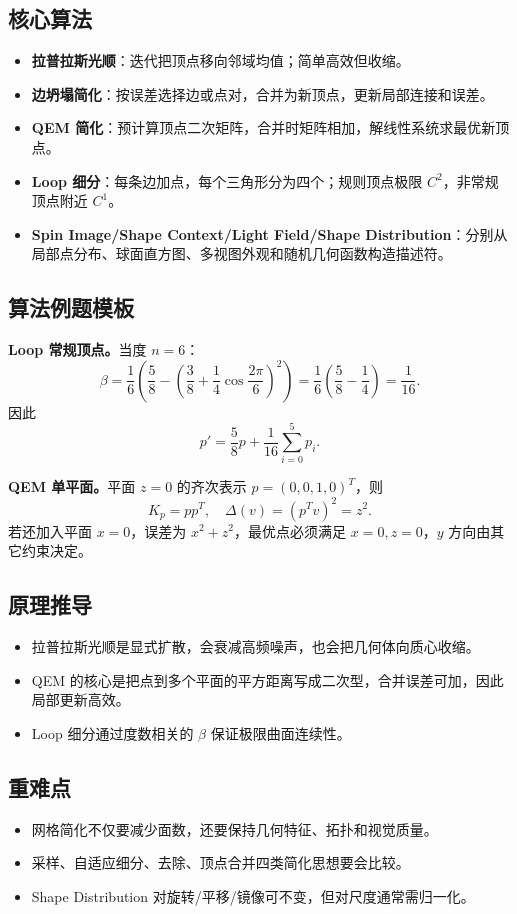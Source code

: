 \documentclass[UTF8,zihao=-4,scheme=chinese,fontset=fandol]{ctexart}
\newcommand{\key}[1]{\textbf{#1}}
\begin{document}
\subsection{核心算法}
\begin{itemize}
  \item \key{拉普拉斯光顺}：迭代把顶点移向邻域均值；简单高效但收缩。
  \item \key{边坍塌简化}：按误差选择边或点对，合并为新顶点，更新局部连接和误差。
  \item \key{QEM 简化}：预计算顶点二次矩阵，合并时矩阵相加，解线性系统求最优新顶点。
  \item \key{Loop 细分}：每条边加点，每个三角形分为四个；规则顶点极限 $C^2$，非常规顶点附近 $C^1$。
  \item \key{Spin Image/Shape Context/Light Field/Shape Distribution}：分别从局部点分布、球面直方图、多视图外观和随机几何函数构造描述符。
\end{itemize}

\subsection{算法例题模板}
\textbf{Loop 常规顶点。}当度 $n=6$：
\[
\beta=\frac16\left(\frac58-\left(\frac38+\frac14\cos\frac{2\pi}{6}\right)^2\right)
=\frac16\left(\frac58-\frac14\right)=\frac1{16}.
\]
因此
\[
p'=\frac58p+\frac1{16}\sum_{i=0}^5p_i.
\]

\textbf{QEM 单平面。}平面 $z=0$ 的齐次表示 $p=(0,0,1,0)^T$，则
\[
K_p=pp^T,\quad \Delta(v)=(p^Tv)^2=z^2.
\]
若还加入平面 $x=0$，误差为 $x^2+z^2$，最优点必须满足 $x=0,z=0$，$y$ 方向由其它约束决定。

\subsection{原理推导}
\begin{itemize}
  \item 拉普拉斯光顺是显式扩散，会衰减高频噪声，也会把几何体向质心收缩。
  \item QEM 的核心是把点到多个平面的平方距离写成二次型，合并误差可加，因此局部更新高效。
  \item Loop 细分通过度数相关的 $\beta$ 保证极限曲面连续性。
\end{itemize}

\subsection{重难点}
\begin{itemize}
  \item 网格简化不仅要减少面数，还要保持几何特征、拓扑和视觉质量。
  \item 采样、自适应细分、去除、顶点合并四类简化思想要会比较。
  \item Shape Distribution 对旋转/平移/镜像可不变，但对尺度通常需归一化。
\end{itemize}
\end{document}
